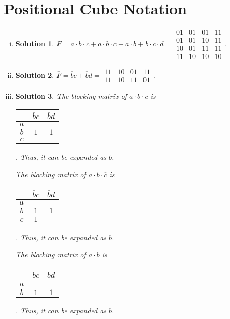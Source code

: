 \documentclass[acmlarge,screen=true,anonymous=false,11pt]{acmart}
\newtheorem*{solution*}{Solution}
\begin{document}
\section{Positional Cube Notation}
\begin{enumerate}[(i)]
    \item \begin{solution*}
        $F = a \cdot b \cdot c + a \cdot b \cdot \overline{c} + \overline{a} \cdot b + \overline{b} \cdot \overline{c} \cdot \overline{d} = \begin{matrix}
        01 & 01 & 01 & 11\\
        01 & 01 & 10 & 11\\
        10 & 01 & 11 & 11\\
        11 & 10 & 10 & 10
        \end{matrix}.$
    \end{solution*}

\item \begin{solution*}
    $\overline{F} = \overline{b}c + \overline{b}d = \begin{matrix}
    11 & 10 & 01 & 11\\
    11 & 10 & 11 & 01
    \end{matrix}$.
\end{solution*}

\item \begin{solution*}
    The blocking matrix of $a \cdot b \cdot c$ is \begin{tabular}{c|cc}
        & $\overline{b}c$ & $\overline{b}d$\\\midrule
        $a$ & &\\
        $b$ & $1$ & $1$\\
        $c$ & &
    \end{tabular}. Thus, it can be expanded as $b$.

The blocking matrix of $a \cdot b \cdot \overline{c}$ is \begin{tabular}{c|cc}
    & $\overline{b}c$ & $\overline{b}d$\\\midrule
    $a$ & &\\
    $b$ & $1$ & $1$\\
    $\overline{c}$ & $1$ &
\end{tabular}. Thus, it can be expanded as $b$.

The blocking matrix of $\overline{a} \cdot b$ is \begin{tabular}{c|cc}
    & $\overline{b}c$ & $\overline{b}d$\\\midrule
    $\overline{a}$ & &\\
    $b$ & $1$ & $1$
\end{tabular}. Thus, it can be expanded as $b$.


\end{solution*}
\end{enumerate}
\end{document}

